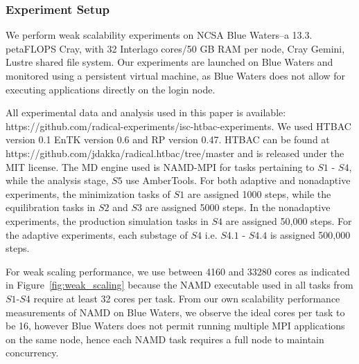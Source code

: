 
\subsubsection{Experiment Setup}\label{ssec:exp_design}

We perform weak scalability experiments on NCSA Blue Waters--a
13.3. petaFLOPS Cray, with 32 Interlago cores/50 GB RAM per node, Cray Gemini,
Lustre shared file system. Our experiments are launched on Blue Waters and
monitored using a persistent virtual machine, as Blue Waters does not allow
for executing applications directly on the login node.

All experimental data and analysis used in this paper is available: \\
https://github.com/radical-experiments/isc-htbac-experiments.
We used HTBAC version 0.1 EnTK version 0.6 and RP version 0.47.
HTBAC can be found at 
https://github.com/jdakka/radical.htbac/tree/master 
and is released under the MIT license. 
The MD engine used is NAMD-MPI for tasks pertaining to $S1$ - $S4$, while the
analysis stage, $S5$ use AmberTools. For both adaptive and nonadaptive
experiments, the minimization tasks of $S1$ are assigned 1000 steps, while
the equilibration tasks in $S2$ and $S3$ are assigned 5000 steps. In the
nonadaptive experiments, the production simulation tasks in $S4$ are assigned
50,000 steps. For the adaptive experiments, each substage of $S4$ i.e. $S4.1$ -
$S4.4$ is assigned 500,000 steps.


For weak scaling performance, we use between 4160 and 33280 cores as indicated in
Figure~\ref{fig:weak_scaling} because the NAMD executable used in all tasks
from $S1$-$S4$ require at least 32 cores per task. From our own scalability
performance measurements of NAMD on Blue Waters, we observe the ideal cores
per task to be 16, however Blue Waters does not permit running multiple MPI
applications on the same node, hence each NAMD task requires a full node to
maintain concurrency.

